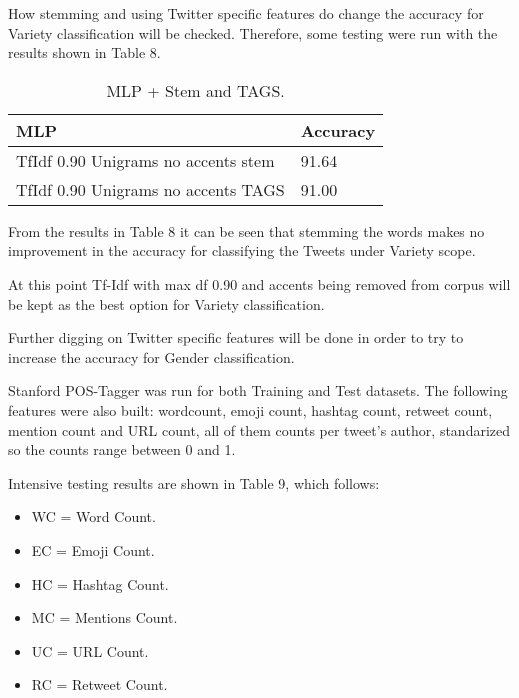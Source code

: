 \documentclass[11pt,a4paper]{article}
\begin{document}
How stemming and using Twitter specific features do change the accuracy for Variety classification will be checked. Therefore, some testing were run with the results shown in Table 8.

\begin{table}[htbp]
\begin{center}
\begin{tabular}{|l|l|}
\hline
MLP & Accuracy \\
\hline \hline
TfIdf 0.90 Unigrams no accents stem & 91.64 \\ \hline
TfIdf 0.90 Unigrams no accents TAGS & 91.00 \\ \hline
\end{tabular}
\caption{MLP + Stem and TAGS.}
\label{tabla:sencilla}
\end{center}
\end{table}

From the results in Table 8 it can be seen that stemming the words makes no improvement in the accuracy for classifying the Tweets under Variety scope.

At this point Tf-Idf with max df 0.90 and accents being removed from corpus will be kept as the best option for Variety classification.

Further digging on Twitter specific features will be done in order to try to increase the accuracy for Gender classification.

Stanford POS-Tagger was run for both Training and Test datasets. The following features were also built: wordcount, emoji count, hashtag count, retweet count, mention count  and URL count, all of them counts per tweet's author, standarized so the counts range between 0 and 1.

Intensive testing results are shown in Table 9, which follows:
    \begin{itemize}
    \addtolength{\itemsep}{-1mm}
    \item WC = Word Count.
    \item EC = Emoji Count.
    \item HC = Hashtag Count.
    \item MC = Mentions Count.
    \item UC = URL Count.
    \item RC = Retweet Count.
    \end{itemize}
\end{document}
